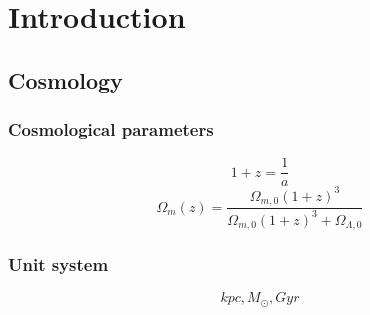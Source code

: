 \chapter{Introduction}
\section{Cosmology}
\subsection{Cosmological parameters}
\begin{equation}
1 + z = \frac{1}{a}
\end{equation}
\begin{equation}
\Omega_m (z) = \frac{\Omega_{m,0} (1+z)^3}{\Omega_{m,0} (1+z)^3 + \Omega_{\Lambda,0}}
\end{equation}

\subsection{Unit system}
\begin{equation}
    kpc, M_\odot, Gyr
\end{equation}

